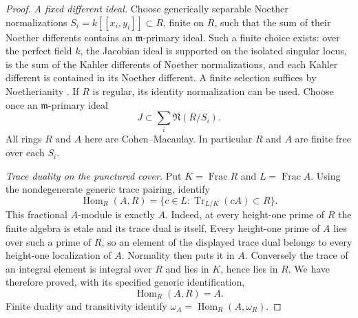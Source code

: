 \begin{proof}
\emph{A fixed different ideal.}
Choose generically separable Noether normalizations
$S_i=k[[x_i,y_i]]\subset R$, finite on $R$, such that the sum of their
Noether differents contains an $\mathfrak m$-primary ideal. Such a finite
choice exists: over the perfect field $k$, the Jacobian ideal is supported
on the isolated singular locus, is the sum of the Kahler differents of
Noether normalizations, and each Kahler different is contained in its
Noether different. A finite selection suffices by Noetherianity
\citep[Section 3, especially (3.1) and Examples 3.2--3.3,
pp.~6--7]{C_IyengarTakahashiStable}.
If $R$ is regular, its identity normalization can be used. Choose once an
$\mathfrak m$-primary ideal
\[
 J\subset\sum_i\mathfrak N(R/S_i).
\]
All rings $R$ and $A$ here are Cohen--Macaulay. In particular $R$ and $A$
are finite free over each $S_i$.

\emph{Trace duality on the punctured cover.}
Put $K=\operatorname{Frac}R$ and $L=\operatorname{Frac}A$.
Using the nondegenerate generic trace pairing, identify
\[
 \operatorname{Hom}_R(A,R)
 =\{c\in L:\operatorname{Tr}_{L/K}(cA)\subset R\}.
\]
This fractional $A$-module is exactly $A$. Indeed, at every height-one
prime of $R$ the finite algebra is etale and its trace dual is itself.
Every height-one prime of $A$ lies over such a prime of $R$, so an element
of the displayed trace dual belongs to every height-one localization of
$A$. Normality then puts it in $A$. Conversely the trace of an integral
element is integral over $R$ and lies in $K$, hence lies in $R$.
We have therefore proved, with its specified generic identification,
\[
 \operatorname{Hom}_R(A,R)=A.                          \tag{D.CD.3}
\]
Finite duality and transitivity identify
$\omega_A=\operatorname{Hom}_R(A,\omega_R)$.


\end{proof}
